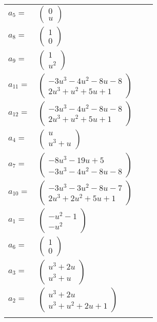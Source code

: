 \documentclass[1p]{elsarticle_modified}
\theoremstyle{definition}
\begin{document}
\begin{tabular}{m{7pt} m{180pt} m{7pt} m{180pt} }
\flushright $a_{5}=$&$\begin{pmatrix}0\\u\end{pmatrix}$ \\
\flushright $a_{8}=$&$\begin{pmatrix}1\\0\end{pmatrix}$ \\
\flushright $a_{9}=$&$\begin{pmatrix}1\\u^2\end{pmatrix}$ \\
\flushright $a_{11}=$&$\begin{pmatrix}-3 u^3-4 u^2-8 u-8\\2 u^3+u^2+5 u+1\end{pmatrix}$ \\
\flushright $a_{12}=$&$\begin{pmatrix}-3 u^3-4 u^2-8 u-8\\2 u^3+u^2+5 u+1\end{pmatrix}$ \\
\flushright $a_{4}=$&$\begin{pmatrix}u\\u^3+u\end{pmatrix}$ \\
\flushright $a_{7}=$&$\begin{pmatrix}-8 u^3-19 u+5\\-3 u^3-4 u^2-8 u-8\end{pmatrix}$ \\
\flushright $a_{10}=$&$\begin{pmatrix}-3 u^3-3 u^2-8 u-7\\2 u^3+2 u^2+5 u+1\end{pmatrix}$ \\
\flushright $a_{1}=$&$\begin{pmatrix}- u^2-1\\- u^2\end{pmatrix}$ \\
\flushright $a_{6}=$&$\begin{pmatrix}1\\0\end{pmatrix}$ \\
\flushright $a_{3}=$&$\begin{pmatrix}u^3+2 u\\u^3+u\end{pmatrix}$ \\
\flushright $a_{2}=$&$\begin{pmatrix}u^3+2 u\\u^3+u^2+2 u+1\end{pmatrix}$\\&\end{tabular}
\end{document}
